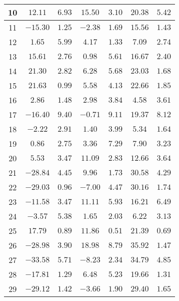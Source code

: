 \begin{table}[H]
\begin{tabular}{|c|c|c|c|c|c|c|}
        10  &    $12.11$   &  $6.93$  & $15.50$  &  $3.10$  & $20.38$  &  $5.42$  \\ \hline
        11  &    $-15.30$  &  $1.25$  & $-2.38$  &  $1.69$  & $15.56$  &  $1.43$  \\ \hline
        12  &    $1.65$    &  $5.99$  & $4.17$   &  $1.33$  & $7.09$   &  $2.74$  \\ \hline
        13  &    $15.61$   &  $2.76$  & $0.98$   &  $5.61$  & $16.67$  &  $2.40$  \\ \hline
        14  &    $21.30$   &  $2.82$  & $6.28$   &  $5.68$  & $23.03$  &  $1.68$  \\ \hline
        15  &    $21.63$   &  $0.99$  & $5.58$   &  $4.13$  & $22.66$  &  $1.85$  \\ \hline
        16  &    $2.86$    &  $1.48$  & $2.98$   &  $3.84$  & $4.58$   &  $3.61$  \\ \hline
        17  &    $-16.40$  &  $9.40$  & $-0.71$  &  $9.11$  & $19.37$  &  $8.12$  \\ \hline
        18  &    $-2.22$   &  $2.91$  & $1.40$   &  $3.99$  & $5.34$   &  $1.64$  \\ \hline
        19  &    $0.86$    &  $2.75$  & $3.36$   &  $7.29$  & $7.90$   &  $3.23$  \\ \hline
        20  &    $5.53$    &  $3.47$  & $11.09$  &  $2.83$  & $12.66$  &  $3.64$  \\ \hline
        21  &    $-28.84$  &  $4.45$  & $9.96$   &  $1.73$  & $30.58$  &  $4.29$  \\ \hline
        22  &    $-29.03$  &  $0.96$  & $-7.00$  &  $4.47$  & $30.16$  &  $1.74$  \\ \hline
        23  &    $-11.58$  &  $3.47$  & $11.11$  &  $5.93$  & $16.21$  &  $6.49$  \\ \hline
        24  &    $-3.57$   &  $5.38$  & $1.65$   &  $2.03$  & $6.22$   &  $3.13$  \\ \hline
        25  &    $17.79$   &  $0.89$  & $11.86$  &  $0.51$  & $21.39$  &  $0.69$  \\ \hline
        26  &    $-28.98$  &  $3.90$  & $18.98$  &  $8.79$  & $35.92$  &  $1.47$  \\ \hline
        27  &    $-33.58$  &  $5.71$  & $-8.23$  &  $2.34$  & $34.79$  &  $4.85$  \\ \hline
        28  &    $-17.81$  &  $1.29$  & $6.48$   &  $5.23$  & $19.66$  &  $1.31$  \\ \hline
        29  &    $-29.12$  &  $1.42$  & $-3.66$  &  $1.90$  & $29.40$  &  $1.65$  \\ \hline

\end{tabular}
\end{table}
